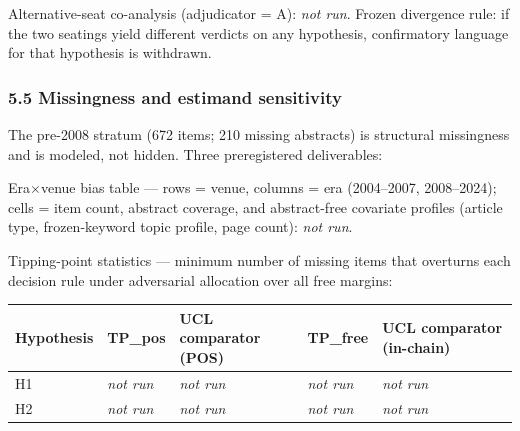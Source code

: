 Alternative-seat co-analysis (adjudicator = A): \emph{not run}. Frozen divergence rule: if the two seatings yield different verdicts on any hypothesis, confirmatory language for that hypothesis is withdrawn.

\subsubsection{5.5 Missingness and estimand sensitivity}\label{missingness-and-estimand-sensitivity}

The pre-2008 stratum (672 items; 210 missing abstracts) is structural missingness and is modeled, not hidden. Three preregistered deliverables:

Era$\times$venue bias table --- rows = venue, columns = era (2004--2007, 2008--2024); cells = item count, abstract coverage, and abstract-free covariate profiles (article type, frozen-keyword topic profile, page count): \emph{not run}.

Tipping-point statistics --- minimum number of missing items that overturns each decision rule under adversarial allocation over all free margins:

\begin{longtable}[]{@{}
  >{\raggedright\arraybackslash}p{}
  >{\raggedright\arraybackslash}p{}
  >{\raggedright\arraybackslash}p{}
  >{\raggedright\arraybackslash}p{}
  >{\raggedright\arraybackslash}p{}@{}}
\toprule\noalign{}
\begin{minipage}[b]{\linewidth}\raggedright
Hypothesis
\end{minipage} & \begin{minipage}[b]{\linewidth}\raggedright
TP\_pos
\end{minipage} & \begin{minipage}[b]{\linewidth}\raggedright
UCL comparator (POS)
\end{minipage} & \begin{minipage}[b]{\linewidth}\raggedright
TP\_free
\end{minipage} & \begin{minipage}[b]{\linewidth}\raggedright
UCL comparator (in-chain)
\end{minipage} \\
\midrule\noalign{}
\endhead
\bottomrule\noalign{}
\endlastfoot
H1 & \emph{not run} & \emph{not run} & \emph{not run} & \emph{not run} \\
H2 & \emph{not run} & \emph{not run} & \emph{not run} & \emph{not run} \\
\end{longtable}

